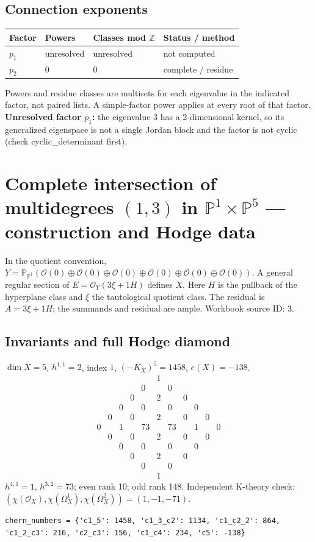 \documentclass[10pt,a4paper]{article}
\begin{document}
\subsection*{Connection exponents}
\begin{center}\begin{tabular}{llll}\toprule Factor & Powers & Classes mod $\mathbb Z$ & Status / method\\\midrule
$p_{1}$ & unresolved & unresolved & not computed\\
$p_{2}$ & $0$ & $0$ & complete / residue\\
\bottomrule\end{tabular}\end{center}
Powers and residue classes are multisets for each eigenvalue in the indicated factor, not paired lists. A simple-factor power applies at every root of that factor.
\textbf{Unresolved factor $p_{1}$:} the eigenvalue 3 has a 2-dimensional kernel, so its generalized eigenspace is not a single Jordan block and the factor is not cyclic (check cyclic\_determinant first).
\clearpage\section*{Complete intersection of multidegrees $(1,3)$ in $\mathbb P^{1}\times \mathbb P^{5}$ --- construction and Hodge data}\label{entry:PB5-003}
In the quotient convention, $Y=\mathbb P_{\mathbb P^{1}}(\mathcal O(0)\oplus\mathcal O(0)\oplus\mathcal O(0)\oplus\mathcal O(0)\oplus\mathcal O(0)\oplus\mathcal O(0))$.
A general regular section of $E=\mathcal O_Y(3\xi+1H)$ defines $X$.
Here $H$ is the pullback of the hyperplane class and $\xi$ the tautological quotient class. The residual is $A=3\xi+1H$; the summands and residual are ample.
Workbook source ID: 3.
\subsection*{Invariants and full Hodge diamond}
$\dim X=5$, $h^{1,1}=2$, index $1$, $(-K_X)^5=1458$, $e(X)=-138$.
\[\begin{array}{ccccccccccc}&&&&&1&&&&&\\&&&&0&&0&&&&\\&&&0&&2&&0&&&\\&&0&&0&&0&&0&&\\&0&&0&&2&&0&&0&\\0&&1&&73&&73&&1&&0\\&0&&0&&2&&0&&0&\\&&0&&0&&0&&0&&\\&&&0&&2&&0&&&\\&&&&0&&0&&&&\\&&&&&1&&&&&\end{array}\]
$h^{4,1}=1$, $h^{3,2}=73$; even rank 10; odd rank 148.
Independent K-theory check: $(\chi(\mathcal O_X),\chi(\Omega_X^1),\chi(\Omega_X^2))=(1, -1, -71)$.
\begin{lstlisting}
chern_numbers = {'c1_5': 1458, 'c1_3_c2': 1134, 'c1_c2_2': 864, 'c1_2_c3': 216, 'c2_c3': 156, 'c1_c4': 234, 'c5': -138}
\end{lstlisting}
\end{document}
